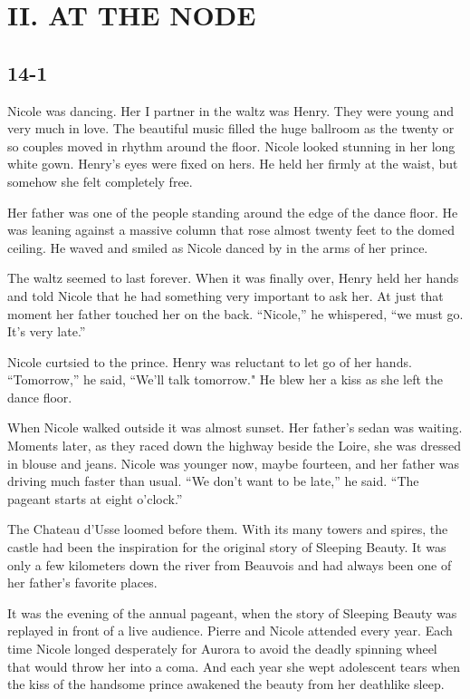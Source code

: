 \documentclass[]{article}
\begin{document}
{\section{II.  AT THE NODE}

\subsection*{14-1}

Nicole was dancing.  Her I partner in the waltz was Henry.  They were young and very much in love.  The beautiful music filled the huge ballroom as the twenty or so couples moved in rhythm around the floor.  Nicole looked stunning in her long white gown.  Henry’s eyes were fixed on hers.  He held her firmly at the waist, but somehow she felt completely free.

Her father was one of the people standing around the edge of the dance floor.  He was leaning against a massive column that rose almost twenty feet to the domed ceiling.  He waved and smiled as Nicole danced by in the arms of her prince.

The waltz seemed to last forever.  When it was finally over, Henry held her hands and told Nicole that he had something very important to ask her.  At just that moment her father touched her on the back.  “Nicole,” he whispered, “we must go.  It’s very late.”

Nicole curtsied to the prince.  Henry was reluctant to let go of her hands.  “Tomorrow,” he said, “We’ll talk tomorrow."  He blew her a kiss as she left the dance floor.

When Nicole walked outside it was almost sunset.  Her father’s sedan was waiting.  Moments later, as they raced down the highway beside the Loire, she was dressed in blouse and jeans.  Nicole was younger now, maybe fourteen, and her father was driving much faster than usual.  “We don’t want to be late,” he said.  “The pageant starts at eight o’clock.”

The Chateau d’Usse loomed before them.  With its many towers and spires, the castle had been the inspiration for the original story of Sleeping Beauty.  It was only a few kilometers down the river from Beauvois and had always been one of her father’s favorite places.

It was the evening of the annual pageant, when the story of Sleeping Beauty was replayed in front of a live audience.  Pierre and Nicole attended every year.  Each time Nicole longed desperately for Aurora to avoid the deadly spinning wheel that would throw her into a coma.  And each year she wept adolescent tears when the kiss of the handsome prince awakened the beauty from her deathlike sleep.

}
\end{document}
